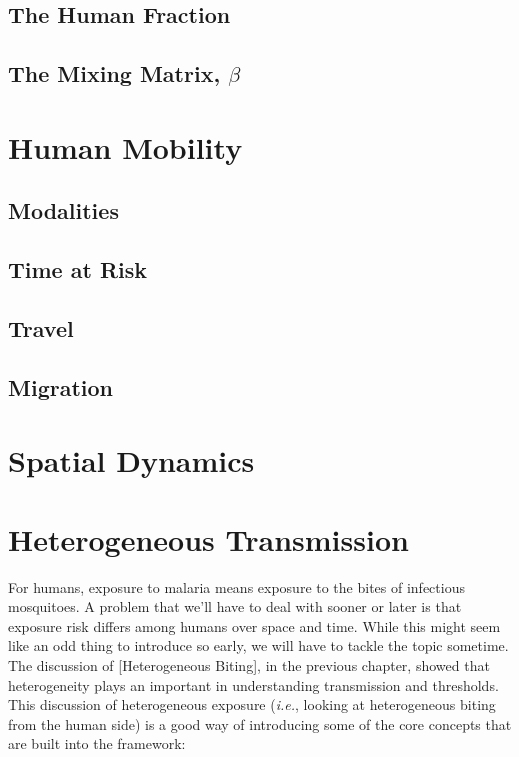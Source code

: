 \documentclass[
]{book}
\begin{document}
\section{The Human Fraction}\label{the-human-fraction}

\section{\texorpdfstring{The Mixing Matrix, \(\beta\)}{The Mixing Matrix, \textbackslash beta}}\label{the-mixing-matrix-beta}

\chapter{Human Mobility}\label{human-mobility}

\section{Modalities}\label{modalities}

\section{Time at Risk}\label{time-at-risk}

\section{Travel}\label{travel}

\section{Migration}\label{migration}

\chapter{Spatial Dynamics}\label{spatial-dynamics-1}

\chapter{Heterogeneous Transmission}\label{heterogeneous-transmission}

For humans, exposure to malaria means exposure to the bites of infectious mosquitoes. A problem that we'll have to deal with sooner or later is that exposure risk differs among humans over space and time. While this might seem like an odd thing to introduce so early, we will have to tackle the topic sometime. The discussion of {[}Heterogeneous Biting{]}, in the previous chapter, showed that heterogeneity plays an important in understanding transmission and thresholds. This discussion of heterogeneous exposure (\emph{i.e.}, looking at heterogeneous biting from the human side) is a good way of introducing some of the core concepts that are built into the framework:
\end{document}
